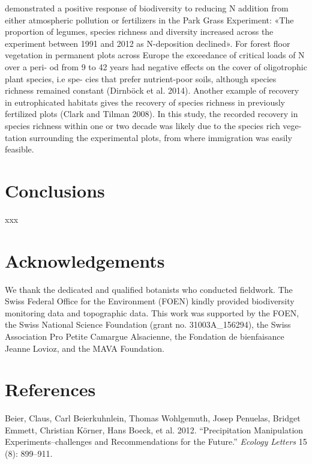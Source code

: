 \documentclass[fleqn,10pt,lineno]{wlpeerj} %
\theoremstyle{definition}
\theoremstyle{definition}
\theoremstyle{definition}
\theoremstyle{remark}
\begin{document}
\begin{itemize}
  demonstrated a positive response of biodiversity to reducing N
  addition from either atmospheric pollution or fertilizers in the Park
  Grass Experiment: «The proportion of legumes, species richness and
  diversity increased across the experiment between 1991 and 2012 as
  N-deposition declined». For forest floor vegetation in permanent plots
  across Europe the exceedance of critical loads of N over a peri- od
  from 9 to 42 years had negative effects on the cover of oligotrophic
  plant species, i.e spe- cies that prefer nutrient-poor soils, although
  species richness remained constant (Dirnböck et al. 2014). Another
  example of recovery in eutrophicated habitats gives the recovery of
  species richness in previously fertilized plots (Clark and Tilman
  2008). In this study, the recorded recovery in species richness within
  one or two decade was likely due to the species rich vege- tation
  surrounding the experimental plots, from where immigration was easily
  feasible.
\end{itemize}

\section*{Conclusions}\label{conclusions}

xxx

\section*{Acknowledgements}\label{acknowledgements}

We thank the dedicated and qualified botanists who conducted fieldwork.
The Swiss Federal Office for the Environment (FOEN) kindly provided
biodiversity monitoring data and topographic data. This work was
supported by the FOEN, the Swiss National Science Foundation (grant no.
31003A\_156294), the Swiss Association Pro Petite Camargue Alsacienne,
the Fondation de bienfaisance Jeanne Lovioz, and the MAVA Foundation.

\section*{References}\label{references}

\hypertarget{refs}{}
\hypertarget{ref-Beier2012}{}
Beier, Claus, Carl Beierkuhnlein, Thomas Wohlgemuth, Josep Penuelas,
Bridget Emmett, Christian Körner, Hans Boeck, et al. 2012.
``Precipitation Manipulation Experiments--challenges and Recommendations
for the Future.'' \emph{Ecology Letters} 15 (8): 899--911.
\end{document}
